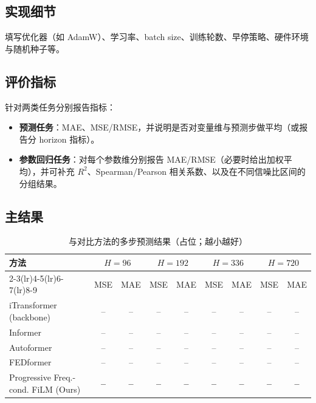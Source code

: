 \subsection{实现细节}
填写优化器（如 AdamW）、学习率、batch size、训练轮数、早停策略、硬件环境与随机种子等。

\subsection{评价指标}
针对两类任务分别报告指标：
\begin{itemize}
  \item \textbf{预测任务}：MAE、MSE/RMSE，并说明是否对变量维与预测步做平均（或报告分 horizon 指标）。
  \item \textbf{参数回归任务}：对每个参数维分别报告 MAE/RMSE（必要时给出加权平均），并可补充 \(R^2\)、Spearman/Pearson 相关系数、以及在不同信噪比区间的分组结果。
\end{itemize}

\subsection{主结果}
\begin{table}[t]
  \centering
  \caption{与对比方法的多步预测结果（占位；越小越好）}
  \label{tab:main_results}
  \begin{tabular}{lcccccccc}
    \toprule
    \multirow{2}{*}{方法} & \multicolumn{2}{c}{\(H=96\)} & \multicolumn{2}{c}{\(H=192\)} & \multicolumn{2}{c}{\(H=336\)} & \multicolumn{2}{c}{\(H=720\)} \\
    \cmidrule(lr){2-3}\cmidrule(lr){4-5}\cmidrule(lr){6-7}\cmidrule(lr){8-9}
    & MSE & MAE & MSE & MAE & MSE & MAE & MSE & MAE \\
    \midrule
    iTransformer (backbone) & -- & -- & -- & -- & -- & -- & -- & -- \\
    Informer~\cite{informer} & -- & -- & -- & -- & -- & -- & -- & -- \\
    Autoformer~\cite{autoformer} & -- & -- & -- & -- & -- & -- & -- & -- \\
    FEDformer~\cite{fedformer} & -- & -- & -- & -- & -- & -- & -- & -- \\
    Progressive Freq.-cond. FiLM (Ours) & \textbf{--} & \textbf{--} & \textbf{--} & \textbf{--} & \textbf{--} & \textbf{--} & \textbf{--} & \textbf{--} \\
    \bottomrule
  \end{tabular}
\end{table}

